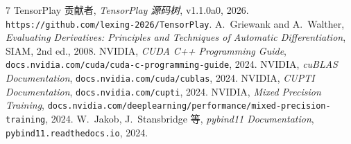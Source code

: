 \documentclass[11pt,a4paper,oneside]{article}
\begin{document}
\printglossary[title={术语表}, toctitle={术语表}]

\begin{thebibliography}{7}
 TensorPlay 贡献者, \emph{TensorPlay 源码树}, v1.1.0a0, 2026. \texttt{https://github.com/lexing-2026/TensorPlay}.
 A.~Griewank and A.~Walther, \emph{Evaluating Derivatives: Principles and Techniques of Automatic Differentiation}, SIAM, 2nd ed., 2008.
 NVIDIA, \emph{CUDA C++ Programming Guide}, \texttt{docs.nvidia.com/cuda/cuda-c-programming-guide}, 2024.
 NVIDIA, \emph{cuBLAS Documentation}, \texttt{docs.nvidia.com/cuda/cublas}, 2024.
 NVIDIA, \emph{CUPTI Documentation}, \texttt{docs.nvidia.com/cupti}, 2024.
 NVIDIA, \emph{Mixed Precision Training}, \texttt{docs.nvidia.com/deeplearning/performance/mixed-precision-training}, 2024.
 W.~Jakob, J.~Stansbridge 等, \emph{pybind11 Documentation}, \texttt{pybind11.readthedocs.io}, 2024.
\end{thebibliography}

\appendix

\end{document}
